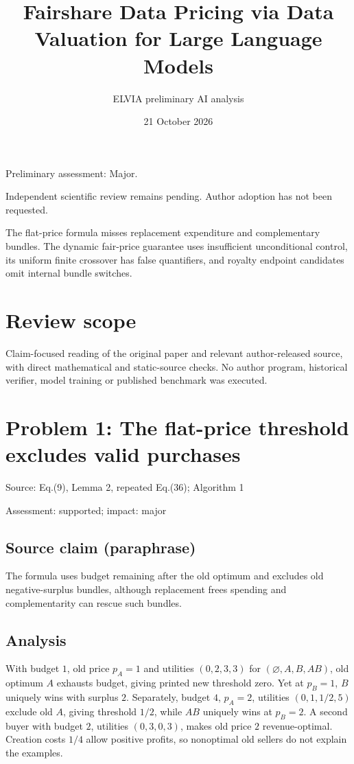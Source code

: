 \documentclass[11pt]{article}
\begin{document}
\title{Fairshare Data Pricing via Data Valuation for Large Language Models}

\author{ELVIA preliminary AI analysis}\date{21 October 2026}\maketitle

Preliminary assessment: Major.\par

Independent scientific review remains pending. Author adoption has not been requested.

The flat-price formula misses replacement expenditure and complementary bundles. The dynamic fair-price guarantee uses insufficient unconditional control, its uniform finite crossover has false quantifiers, and royalty endpoint candidates omit internal bundle switches.

\section*{Review scope}

Claim-focused reading of the original paper and relevant author-released source, with direct mathematical and static-source checks. No author program, historical verifier, model training or published benchmark was executed.

\section*{Problem 1: The flat-price threshold excludes valid purchases}

Source: Eq.(9), Lemma 2, repeated Eq.(36); Algorithm 1

Assessment: supported; impact: major

\subsection*{Source claim (paraphrase)}

The formula uses budget remaining after the old optimum and excludes old negative-surplus bundles, although replacement frees spending and complementarity can rescue such bundles.

\subsection*{Analysis}

With budget \(1\), old price \(p_A=1\) and utilities \((0,2,3,3)\) for \((\varnothing,A,B,AB)\), old optimum \(A\) exhausts budget, giving printed new threshold zero. Yet at \(p_B=1\), \(B\) uniquely wins with surplus \(2\). Separately, budget \(4\), \(p_A=2\), utilities \((0,1,1/2,5)\) exclude old \(A\), giving threshold \(1/2\), while \(AB\) uniquely wins at \(p_B=2\). A second buyer with budget \(2\), utilities \((0,3,0,3)\), makes old price \(2\) revenue-optimal. Creation costs \(1/4\) allow positive profits, so nonoptimal old sellers do not explain the examples.
\end{document}
